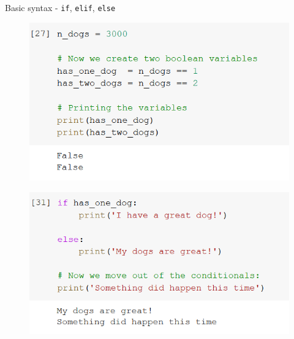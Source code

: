 \documentclass[aspectratio=169]{beamer}
\begin{document}
\begin{frame}{Basic syntax - \texttt{if}, \texttt{elif}, \texttt{else}}

	\begin{multicols}{2}

		\begin{figure}
			\centering
			\includegraphics[width=\linewidth]{img/boolean_variables.png}
		\end{figure}
		\begin{figure}
			\centering
			\includegraphics[width=\linewidth]{img/if_else.png}
		\end{figure}

	\end{multicols}

\end{frame}
\end{document}
